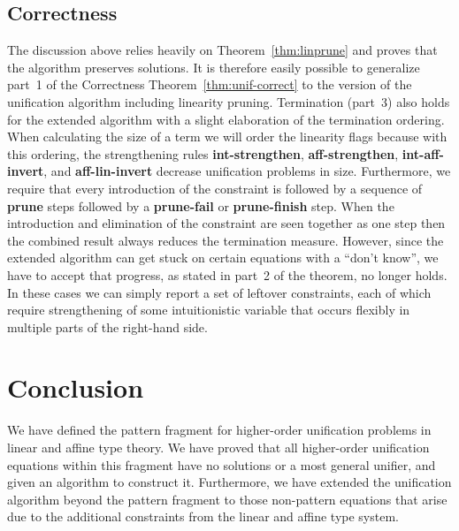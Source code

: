 \documentclass{eptcs}
\theoremstyle{definition}
\begin{document}
\subsection{Correctness}
The discussion above relies heavily on
Theorem~\ref{thm:linprune} and proves that the algorithm preserves
solutions.   It is therefore easily possible to generalize part~1 of the Correctness
Theorem~\ref{thm:unif-correct} to the version of the unification
algorithm including linearity pruning.
Termination (part~3) also holds for the extended algorithm with a slight
elaboration of the termination ordering.  When calculating the size of
a term we will order the linearity flags  because with
this ordering,
the strengthening rules \textbf{int-strengthen},
\textbf{aff-strengthen}, \textbf{int-aff-invert}, and
\textbf{aff-lin-invert} decrease unification problems in size.
Furthermore, we require
that every introduction of the  constraint is followed by
a sequence of \textbf{prune} steps followed by a \textbf{prune-fail} or
\textbf{prune-finish} step.  When the introduction and elimination of
the  constraint are seen together as one step then the
combined result  always reduces the termination measure.
However, since the extended algorithm can get
stuck on certain equations with a ``don't know'', we have to
accept that progress, as stated in part~2 of the theorem, no
longer holds.  In these cases we can simply report a set of leftover
constraints, each of which require strengthening of some intuitionistic
variable that occurs flexibly in multiple parts of the right-hand side.



\section{Conclusion}
We have defined the pattern fragment for higher-order unification problems
in linear and affine type theory.  We have proved that all higher-order
unification equations within this fragment have no solutions or a most
general unifier, and given an algorithm to construct it.  Furthermore,
we have extended the unification algorithm beyond the pattern fragment
to those non-pattern equations that arise due to the additional
constraints from the linear and affine type system.




\end{document}
